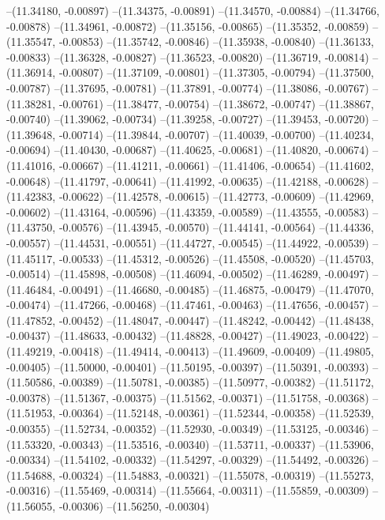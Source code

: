 --(11.34180, -0.00897)
--(11.34375, -0.00891)
--(11.34570, -0.00884)
--(11.34766, -0.00878)
--(11.34961, -0.00872)
--(11.35156, -0.00865)
--(11.35352, -0.00859)
--(11.35547, -0.00853)
--(11.35742, -0.00846)
--(11.35938, -0.00840)
--(11.36133, -0.00833)
--(11.36328, -0.00827)
--(11.36523, -0.00820)
--(11.36719, -0.00814)
--(11.36914, -0.00807)
--(11.37109, -0.00801)
--(11.37305, -0.00794)
--(11.37500, -0.00787)
--(11.37695, -0.00781)
--(11.37891, -0.00774)
--(11.38086, -0.00767)
--(11.38281, -0.00761)
--(11.38477, -0.00754)
--(11.38672, -0.00747)
--(11.38867, -0.00740)
--(11.39062, -0.00734)
--(11.39258, -0.00727)
--(11.39453, -0.00720)
--(11.39648, -0.00714)
--(11.39844, -0.00707)
--(11.40039, -0.00700)
--(11.40234, -0.00694)
--(11.40430, -0.00687)
--(11.40625, -0.00681)
--(11.40820, -0.00674)
--(11.41016, -0.00667)
--(11.41211, -0.00661)
--(11.41406, -0.00654)
--(11.41602, -0.00648)
--(11.41797, -0.00641)
--(11.41992, -0.00635)
--(11.42188, -0.00628)
--(11.42383, -0.00622)
--(11.42578, -0.00615)
--(11.42773, -0.00609)
--(11.42969, -0.00602)
--(11.43164, -0.00596)
--(11.43359, -0.00589)
--(11.43555, -0.00583)
--(11.43750, -0.00576)
--(11.43945, -0.00570)
--(11.44141, -0.00564)
--(11.44336, -0.00557)
--(11.44531, -0.00551)
--(11.44727, -0.00545)
--(11.44922, -0.00539)
--(11.45117, -0.00533)
--(11.45312, -0.00526)
--(11.45508, -0.00520)
--(11.45703, -0.00514)
--(11.45898, -0.00508)
--(11.46094, -0.00502)
--(11.46289, -0.00497)
--(11.46484, -0.00491)
--(11.46680, -0.00485)
--(11.46875, -0.00479)
--(11.47070, -0.00474)
--(11.47266, -0.00468)
--(11.47461, -0.00463)
--(11.47656, -0.00457)
--(11.47852, -0.00452)
--(11.48047, -0.00447)
--(11.48242, -0.00442)
--(11.48438, -0.00437)
--(11.48633, -0.00432)
--(11.48828, -0.00427)
--(11.49023, -0.00422)
--(11.49219, -0.00418)
--(11.49414, -0.00413)
--(11.49609, -0.00409)
--(11.49805, -0.00405)
--(11.50000, -0.00401)
--(11.50195, -0.00397)
--(11.50391, -0.00393)
--(11.50586, -0.00389)
--(11.50781, -0.00385)
--(11.50977, -0.00382)
--(11.51172, -0.00378)
--(11.51367, -0.00375)
--(11.51562, -0.00371)
--(11.51758, -0.00368)
--(11.51953, -0.00364)
--(11.52148, -0.00361)
--(11.52344, -0.00358)
--(11.52539, -0.00355)
--(11.52734, -0.00352)
--(11.52930, -0.00349)
--(11.53125, -0.00346)
--(11.53320, -0.00343)
--(11.53516, -0.00340)
--(11.53711, -0.00337)
--(11.53906, -0.00334)
--(11.54102, -0.00332)
--(11.54297, -0.00329)
--(11.54492, -0.00326)
--(11.54688, -0.00324)
--(11.54883, -0.00321)
--(11.55078, -0.00319)
--(11.55273, -0.00316)
--(11.55469, -0.00314)
--(11.55664, -0.00311)
--(11.55859, -0.00309)
--(11.56055, -0.00306)
--(11.56250, -0.00304)
